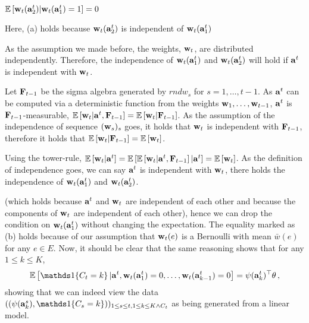 $\mathbb{E} \left[ \mathbf{w}_t(\mathbf{a}^t_2) | \mathbf{w}_t(\mathbf{a}^t_1 ) = 1  \right] = 0$%

Here, (a) holds because $\mathbf{w}_t(\mathbf{a}_2^t)$ is independent of $\mathbf{w}_t(\mathbf{a}_1^t)$


As the assumption we made before, the weights, $\mathbf{w}_t$, are distributed independently. Therefore, the independence of $\mathbf{w}_t(\mathbf{a}_1^t)$ and $\mathbf{w}_t(\mathbf{a}_2^t)$ will hold if $\mathbf{a}^t$ is independent with $\mathbf{w}_t$.

Let $\mathbf{F}_{t-1}$ be the sigma algebra generated by $rnd{w}_s$ for $s = 1, \dots, t-1$. As $\mathbf{a}^t$ can be computed via a deterministic function from the weights $\mathbf{w}_1, \dots, \mathbf{w}_{t-1}$, $\mathbf{a}^t$ is $\mathbf{F}_{t-1}$-measurable, $\mathbb{E} \left[\mathbf{w}_t | \mathbf{a}^t , \mathbf{F}_{t-1}\right] = \mathbb{E} \left[\mathbf{w}_t | \mathbf{F}_{t-1}\right]$. As the assumption of the independence of sequence $(\mathbf{w}_s)_s$ goes, it holds that $\mathbf{w}_t$ is independent with $\mathbf{F}_{t-1}$, therefore it holds that $\mathbb{E} \left[\mathbf{w}_t | \mathbf{F}_{t-1}\right] = \mathbb{E} \left[\mathbf{w}_t\right]$.

Using the tower-rule, $\mathbb{E} \left[\mathbf{w}_t | \mathbf{a}^t\right]=\mathbb{E} \left[\mathbb{E} \left[\mathbf{w}_t | \mathbf{a}^t , \mathbf{F}_{t-1}\right] | \mathbf{a}^t\right]=\mathbb{E} \left[\mathbf{w}_t\right]$. As the definition of independence goes, we can say $\mathbf{a}^t$ is independent with $\mathbf{w}_t$, there holds the independence of $\mathbf{w}_t(\mathbf{a}_1^t)$ and $\mathbf{w}_t(\mathbf{a}_2^t)$.

(which holds because $\mathbf{a}^t$ and $\mathbf{w}_t$ are independent of each other
and because the components of $\mathbf{w}_t$ are independent of each other),
hence we can drop the condition on $\mathbf{w}_t(\mathbf{a}_1^t)$ without changing the expectation.
The equality marked as (b) holds because of our assumption that $\mathbf{w}_t(e)$ is a Bernoulli with mean $\bar{w}(e)$ for any $e\in E$. Now, it should be clear that the same reasoning shows that for any $1\le k \le K$,
\begin{align*}
\EE{ \I{C_t=k} | \rnd{a}^t, \rnd{w}_t(\rnd{a}^t_1 ) = 0, \dots,  \rnd{w}_t(\rnd{a}^t_{k-1} ) = 0 }
= \psi(\rnd{a}^t_k)^\top \theta\,,
\end{align*}
showing that we can indeed view the data
$( (\psi(\rnd{a}^s_k), \I{C_s=k} ) )_{1\le s\le t, 1\le k \le K \wedge C_t }$ as being generated from a linear model.

